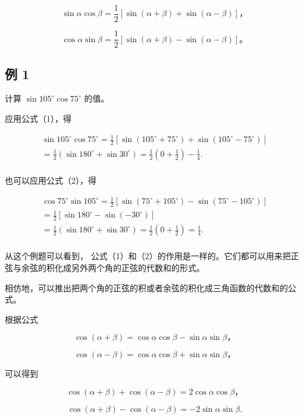 \[
\sin \alpha \cos \beta = \frac {1}{2} [ \sin (\alpha + \beta) + \sin (\alpha - \beta) ]\text{，} \tag {1}
\]

\[
\cos \alpha \sin \beta = \frac {1}{2} [ \sin (\alpha + \beta) - \sin (\alpha - \beta) ]\text{。} \tag {2}
\]

\subsection{例 1}

计算 \(\sin 105^{\circ} \cos 75^{\circ}\) 的值。

 应用公式（1），得

\[
\begin{array}{l} \sin 105 ^{\circ} \cos 75 ^{\circ} = \frac {1}{2} [ \sin (105 ^{\circ} + 75 ^{\circ}) + \sin (105 ^{\circ} - 75 ^{\circ}) ] \\ = \frac {1}{2} (\sin 180 ^{\circ} + \sin 30 ^{\circ}) = \frac {1}{2} \left(0 + \frac {1}{2}\right) - \frac {1}{4}. \\ \end{array}
\]

也可以应用公式（2），得

\[
\begin{array}{l} \cos 75 ^{\circ} \sin 105 ^{\circ} = \frac {1}{2} [ \sin (75 ^{\circ} + 105 ^{\circ}) - \sin (75 ^{\circ} - 105 ^{\circ}) ] \\ = \frac {1}{2} [ \sin 180 ^{\circ} - \sin (- 30 ^{\circ}) ] \\ = \frac {1}{2} (\sin 180 ^{\circ} + \sin 30 ^{\circ}) = \frac {1}{2} \left(0 + \frac {1}{2}\right) = \frac {1}{4}. \\ \end{array}
\]

从这个例题可以看到，
公式（1）和（2）的作用是一样的。它们都可以用来把正弦与余弦的积化成另外两个角的正弦的代数和的形式。

相仿地，可以推出把两个角的正弦的积或者余弦的积化成三角函数的代数和的公式。

根据公式

\[
\cos (\alpha + \beta) = \cos \alpha \cos \beta - \sin \alpha \sin \beta \text{，}
\]

\[
\cos (\alpha - \beta) = \cos \alpha \cos \beta + \sin \alpha \sin \beta \text{，}
\]

可以得到

\[
\cos (\alpha + \beta) + \cos (\alpha - \beta) = 2 \cos \alpha \cos \beta \text{，}
\]

\[
\cos (\alpha + \beta) - \cos (\alpha - \beta) = - 2 \sin \alpha \sin \beta .
\]

